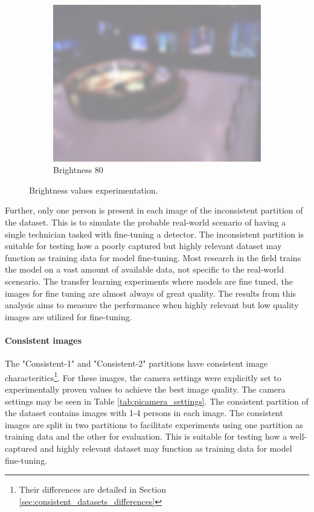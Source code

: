 \begin{figure}[H]
\begin{subfigure}{0.30\textwidth}
        \centering
        \includegraphics[width=\textwidth]{Images/DeviceImages/1st-iteration/hallvard-090224-132210-0-bright80.jpg}
        \caption{Brightness 80}
    \end{subfigure}
    \caption{Brightness values experimentation.}
    \label{fig:brightness_experimentation}
\end{figure}

Further, only one person is present in each image of the inconsistent partition of the dataset. This is to simulate the probable real-world scenario of having a single technician tasked with fine-tuning a detector. The inconsistent partition is suitable for testing how a poorly captured but highly relevant dataset may function as training data for model fine-tuning. Most research in the field trains the model on a vast amount of available data, not specific to the real-world sceneario. The transfer learning experiments where models are fine tuned, the images for fine tuning are almost always of great quality. The results from this analysis aims to measure the performance when highly relevant but low quality images are utilized for fine-tuning.

\paragraph{Consistent images}
The "Consistent-1" and "Consistent-2" partitions have consistent image characteritics\footnote{Their differences are detailed in Section \ref{sec:consistent_datasets_differences}}. For these images, the camera settings were explicitly set to experimentally proven values to achieve the best image quality. The camera settings may be seen in Table \ref{tab:picamera_settings}. The consistent partition of the dataset contains images with 1-4 persons in each image. The consistent images are split in two partitions to facilitate experiments using one partition as training data and the other for evaluation. This is suitable for testing how a well-captured and highly relevant dataset may function as training data for model fine-tuning. 


